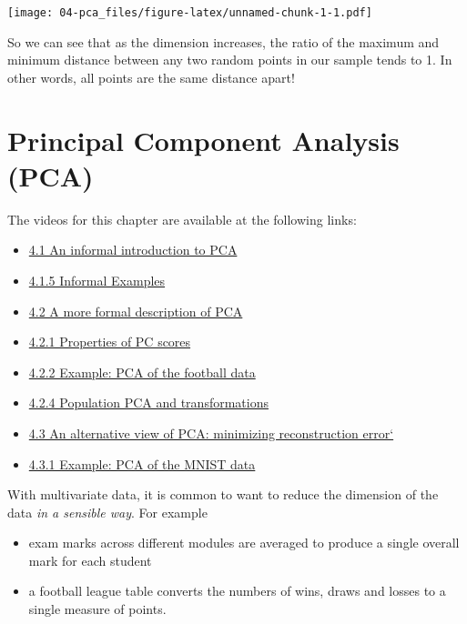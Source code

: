 \documentclass[
]{book}
\providecommand{\tightlist}{%
  \setlength{\itemsep}{0pt}\setlength{\parskip}{0pt}}
\theoremstyle{definition}
\theoremstyle{definition}
\theoremstyle{definition}
\theoremstyle{definition}
\theoremstyle{remark}
\begin{document}
\texttt{[image: 04-pca\_files/figure-latex/unnamed-chunk-1-1.pdf]}

So we can see that as the dimension increases, the ratio of the maximum and minimum distance between any two random points in our sample tends to 1. In other words, all points are the same distance apart!

\hypertarget{pca}{%
\chapter{Principal Component Analysis (PCA)}\label{pca}}

The videos for this chapter are available at the following links:

\begin{itemize}
\tightlist
\item
  \href{https://mediaspace.nottingham.ac.uk/media/PCA_Informal/1_zs9dumou}{4.1 An informal introduction to PCA}
\item
  \href{https://mediaspace.nottingham.ac.uk/media/PCA+Informal+Examples/1_3c9ghrtf}{4.1.5 Informal Examples}
\item
  \href{https://mediaspace.nottingham.ac.uk/media/PCA+Formal+Description/1_tq8tpcn0}{4.2 A more formal description of PCA}
\item
  \href{https://mediaspace.nottingham.ac.uk/media/PCAA+Properties+\%28edited\%29/1_vax8yhp9}{4.2.1 Properties of PC scores}
\item
  \href{https://mediaspace.nottingham.ac.uk/media/PCA+Football+Example/1_h70vgqq2}{4.2.2 Example: PCA of the football data}
\item
  \href{https://mediaspace.nottingham.ac.uk/media/Population+PCA+and+transformations/1_y1s2arei}{4.2.4 Population PCA and transformations}
\item
  \href{https://mediaspace.nottingham.ac.uk/media/PCAA+Minimizing+Reconstruction+Error/1_93tzf0ju}{4.3 An alternative view of PCA: minimizing reconstruction error`}
\item
  \href{https://mediaspace.nottingham.ac.uk/media/PCAA+MNIST+example/1_ljte3zc1}{4.3.1 Example: PCA of the MNIST data}
\end{itemize}

With multivariate data, it is common to want to reduce the dimension of the data \emph{in a sensible way}. For example

\begin{itemize}
\item
  exam marks across different modules are
  averaged to produce a single overall mark for each
  student
\item
  a football league table converts the
  numbers of wins, draws and losses to a single measure of
  points.
\end{itemize}
\end{document}
